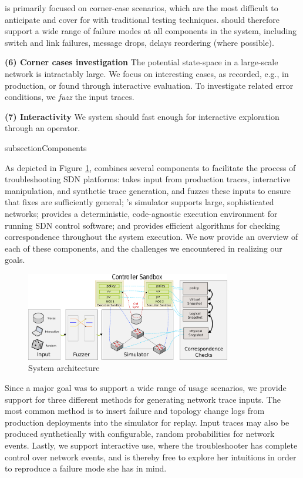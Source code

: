  \projectname{} is primarily
focused on corner-case scenarios, which are the most difficult to anticipate
and cover for with traditional testing techniques. \projectname{} should
therefore support a wide range of failure modes at all components in the
system, including switch and link failures, message drops, delays reordering (where possible).

\textbf{(6) Corner cases investigation} The potential state-space in a large-scale network
is intractably large. We focus on interesting cases, as recorded, e.g., in production, or
found through interactive evaluation. To investigate related error conditions,
we \emph{fuzz} the input traces.

\textbf{(7) Interactivity} We system should fast enough for interactive exploration through
an operator.

subsection{Components}

As depicted in Figure \ref{fig:system}, \projectname{} combines several
components to facilitate the process of troubleshooting SDN platforms:
\projectname{} takes input
from production traces, interactive manipulation, and synthetic trace
generation, and fuzzes these inputs to ensure that fixes are sufficiently general;
\projectname{}'s simulator supports large, sophisticated networks;
\projectname{} provides a deterministic, code-agnostic execution environment 
for running SDN control software; and provides efficient algorithms for
checking correspondence throughout the system execution. We now provide an
overview of each of these components, and the challenges we encountered in
realizing our goals.

\begin{figure}[!t]
  \centering
  \includegraphics[width=0.8\textwidth]{../diagrams/architecture/architecture.pdf}
  \caption{System architecture}
  \label{fig:system}
\end{figure}

 Since a major goal \projectname{} was
to support a wide range of usage scenarios, %
we provide support for three different methods for generating network trace
inputs. The most common method is to insert failure and topology change logs
from production deployments into the simulator for replay. Input traces may
also be produced synthetically with configurable, random probabilities for
network events. Lastly, we support interactive use, where the troubleshooter
has complete control over network events, and is thereby free to explore her
intuitions in order to reproduce a failure mode she has in mind.

